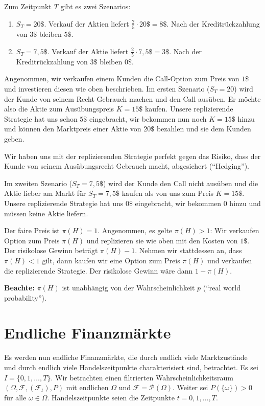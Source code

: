 \documentclass[a4paper,twoside,DIV15,BCOR12mm]{scrbook}
\newcommand{\cF}{\mathcal F}
\begin{document}
\begin{beispiel}
Zum Zeitpunkt $T$ gibt es zwei Szenarios:
\begin{enumerate}
\item $S_T=20\$$. Verkauf der Aktien liefert $\frac 25 \cdot 20\$ = 8\$$. Nach der Kreditrückzahlung von $3\$$ bleiben $5\$$.
\item $S_T=7,5\$$. Verkauf der Aktie liefert $\frac 25 \cdot 7,5\$ = 3\$$. Nach der Kreditrückzahlung von $3\$$ bleiben $0\$$.
\end{enumerate}

Angenommen, wir verkaufen einem Kunden die Call-Option zum Preis von $1\$$ und investieren diesen wie oben beschrieben. Im ersten Szenario ($S_T=20$) wird der Kunde von seinem Recht Gebrauch machen und den Call ausüben. Er möchte also die Aktie zum Ausübungspreis $K=15\$$ kaufen. Unsere replizierende Strategie hat uns schon $5\$$ eingebracht, wir bekommen nun noch $K=15\$$ hinzu und können den Marktpreis einer Aktie von $20\$$ bezahlen und sie dem Kunden geben.

Wir haben uns mit der replizierenden Strategie perfekt gegen das Risiko, dass der Kunde  von seinem Ausübungsrecht Gebrauch macht, abgesichert (“Hedging”).

Im zweiten Szenario ($S_T=7,5\$$) wird der Kunde den Call nicht ausüben und die Aktie lieber am Markt für $S_T=7,5\$$ kaufen als von uns zum Preis $K=15\$$. Unsere replizierende Strategie hat uns $0\$$ eingebracht, wir bekommen 0 hinzu und müssen keine Aktie liefern.

Der faire Preis ist $\pi(H)=1$.
Angenommen, es gelte $\pi(H)>1$: Wir verkaufen Option zum Preis $\pi(H)$ und replizieren sie wie oben mit den Kosten von $1\$$. Der risikolose Gewinn beträgt $\pi(H) - 1$. Nehmen wir stattdessen an, dass $\pi(H)<1$ gilt, dann kaufen wir eine Option zum Preis $\pi(H)$ und verkaufen die replizierende Strategie. Der risikolose Gewinn wäre dann $1-\pi(H)$.

\textbf{Beachte:} $\pi(H)$ ist unabhängig von der Wahrscheinlichkeit $p$ (“real world probability”).
\end{beispiel}

\section{Endliche Finanzmärkte}
\label{sec:2.3}

Es werden nun endliche Finanzmärkte, die durch endlich viele Marktzustände und durch endlich viele Handelszeitpunkte charakterisiert sind, betrachtet. Es sei $I=\{0, 1,\ldots,T\}$. Wir betrachten einen filtrierten Wahrscheinlichkeitsraum $(\Omega,\cF,(\cF_t),P)$ mit endlichen $\Omega$ und $\cF=\mathcal P(\Omega)$. Weiter sei $P(\{\omega\})>0$ für alle $\omega\in\Omega$. Handelszeitpunkte seien die Zeitpunkte $t=0, 1,\ldots,T$.
\end{document}
